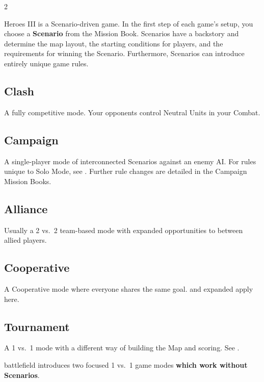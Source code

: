 
\begin{multicols*}{2}

Heroes III is a Scenario-driven game.
In the first step of each game's setup, you choose a \textbf{Scenario} from the Mission Book.
Scenarios have a backstory and determine the map layout, the starting conditions for players, and the requirements for winning the Scenario.
Furthermore, Scenarios can introduce entirely unique game rules.

\bigskip
\bigskip
{}

\subsection*{Clash}
A fully competitive mode.
Your opponents control Neutral Units in your Combat.

\subsection*{Campaign}
A single-player mode of interconnected Scenarios against an enemy AI.
For rules unique to Solo Mode, see .
Further rule changes are detailed in the Campaign Mission Books.

\subsection*{Alliance}
Usually a 2 vs.~2 team-based mode with expanded opportunities to  between allied players.

\subsection*{Cooperative}
A Cooperative mode where everyone shares the same goal.
 and expanded  apply here.

\subsection*{Tournament}
A 1 vs.~1 mode with a different way of building the Map and scoring.
See .

\bigskip
\begin{expansion}[before=\vspace*{-10mm}]{battlefield}
   introduces two focused 1 vs.~1 game modes \textbf{which work without Scenarios}.


\end{expansion}
\end{multicols*}
